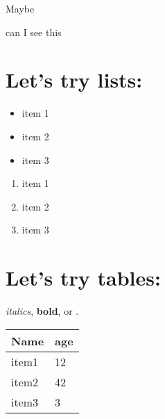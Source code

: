 \documentclass[letterpaper,10pt,english]{sphinxmanual}
\begin{document}
Maybe

can I see this


\chapter{Let's try lists:}
\label{introduction:reftest}\label{introduction:let-s-try-lists}\begin{itemize}
\item {} 
item 1

\item {} 
item 2

\item {} 
item 3

\end{itemize}
\begin{enumerate}
\item {} 
item 1

\item {} 
item 2

\item {} 
item 3

\end{enumerate}


\chapter{Let's try tables:}
\label{introduction:let-s-try-tables}
\emph{italics}, \textbf{bold}, or .

\begin{tabulary}{\linewidth}{|L|L|}
\hline
\textsf{\relax 
Name
} & \textsf{\relax 
age
}\\
\hline
item1
 & 
12
\\
\hline
item2
 & 
42
\\
\hline
item3
 & 
3
\\
\hline\end{tabulary}
\end{document}
